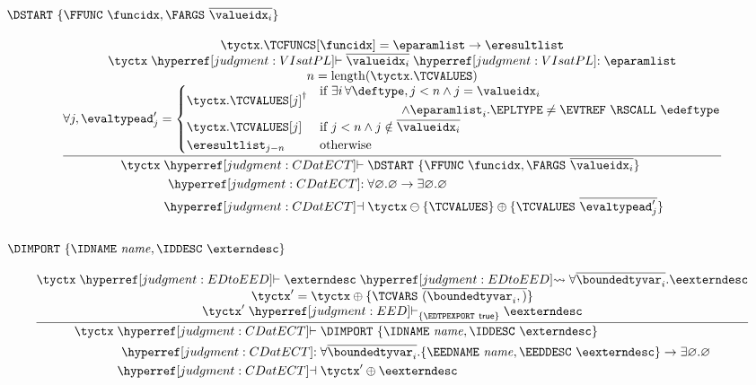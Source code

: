 \subsubsection{$\DSTART~\{ \FFUNC~\funcidx, \FARGS~\overline{\valueidx_i} \}$}
\[
  \frac{
    \begin{array}{@{}c@{}}
    \tyctx.\TCFUNCS[\funcidx] = \eparamlist \to \eresultlist\\
    \tyctx \vdashh!VIsatPL! \overline{\valueidx_i} \trelh!VIsatPL! \eparamlist\\
    n = \F{length}(\tyctx.\TCVALUES)\\
    \forall j, \evaltypead'_j = \begin{cases}
      \tyctx.\TCVALUES[j]^\dagger&
        {\begin{aligned}
          \text{if }\exists i\,\forall \deftype,{} & j < n \land j = \valueidx_i\\
          \land {}&{\eparamlist}_i.\EPLTYPE \neq \EVTREF~\RSCALL~\edeftype\\
        \end{aligned}}\\
      \tyctx.\TCVALUES[j]&\text{if }j <n\land j \notin \overline{\valueidx_i}\\
      {\eresultlist}_{j-n}&\text{otherwise}\\
    \end{cases}\\
    \end{array}
  }{
    \begin{aligned}
    \tyctx \vdashh!CDatECT!{}&\DSTART~\{ \FFUNC~\funcidx, \FARGS~\overline{\valueidx_i} \}\\
    \trelh!CDatECT!{}&\forall\varnothing.\varnothing \to \exists\varnothing.\varnothing\\
    \dashvh!CDatECT!{}&\tyctx \ominus \{ \TCVALUES \} \oplus \{ \TCVALUES~\overline{\evaltypead'_j} \}\\
    \end{aligned}
  }
\]

\subsubsection{$\DIMPORT~\{ \IDNAME~\name, \IDDESC~\externdesc \}$}
\[
  \frac{
    \begin{array}{@{}c@{}}
      \tyctx \vdashh!EDtoEED! \externdesc \leadstoh!EDtoEED! \forall\overline{\boundedtyvar_i}.\eexterndesc\\
      \tyctx' = \tyctx \oplus \{ \TCVARS~\overline{(\boundedtyvar_i,)} \}\\
      \tyctx' \vdashh!EED!_{\{\EDTPEXPORT~\true\}} \eexterndesc
    \end{array}
  }{
    \begin{aligned}
    \tyctx \vdashh!CDatECT!{}&\DIMPORT~\{ \IDNAME~\name, \IDDESC~\externdesc \}\\
    \trelh!CDatECT!{}&\forall\overline{\boundedtyvar_i}.\{ \EEDNAME~\name, \EEDDESC~\eexterndesc \} \to \exists\varnothing.\varnothing\\
    \dashvh!CDatECT!{}&\tyctx' \oplus \eexterndesc\\
    \end{aligned}
  }
\]

